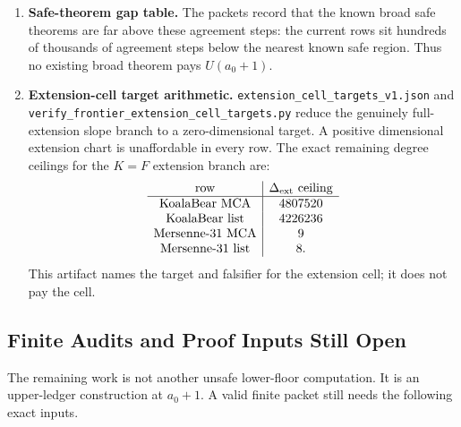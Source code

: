 \begin{enumerate}[label=\textup{(\arabic*)}]
\item \textbf{Safe-theorem gap table.}
The packets record that the known broad safe theorems are far above these
agreement steps: the current rows sit hundreds of thousands of agreement steps
below the nearest known safe region.  Thus no existing broad theorem pays
\(U(a_0+1)\).

\item \textbf{Extension-cell target arithmetic.}
\texttt{extension\_cell\_targets\_v1.json} and
\texttt{verify\_frontier\_extension\_cell\_targets.py} reduce the genuinely
full-extension slope branch to a zero-dimensional target.  A positive
dimensional extension chart is unaffordable in every row.  The exact remaining
degree ceilings for the \(K=F\) extension branch are:
\[
\begin{array}{c|c}
\text{row} & \Delta_{\rm ext}\text{ ceiling}\\ \hline
\text{KoalaBear MCA} & 4807520\\
\text{KoalaBear list} & 4226236\\
\text{Mersenne-31 MCA} & 9\\
\text{Mersenne-31 list} & 8.
\end{array}
\]
This artifact names the target and falsifier for the extension cell; it does
not pay the cell.
\end{enumerate}

\subsection{Finite Audits and Proof Inputs Still Open}

The remaining work is not another unsafe lower-floor computation.  It is an
upper-ledger construction at \(a_0+1\).  A valid finite packet still needs the
following exact inputs.

